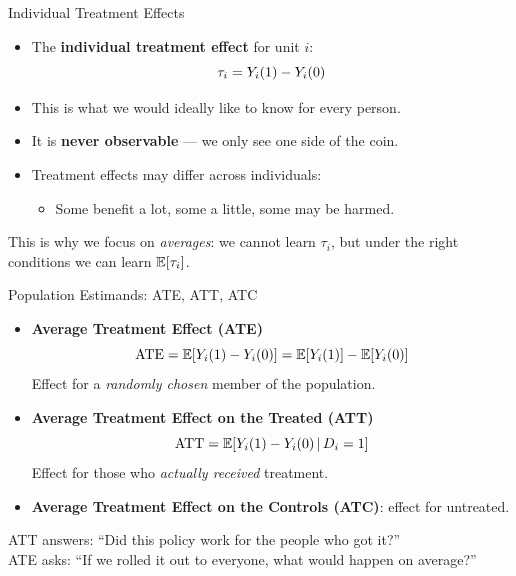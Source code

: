 \documentclass[aspectratio=169, 11pt]{beamer}
\begin{document}
\begin{frame}[t]{Individual Treatment Effects}
\begin{itemize}
  \setlength\itemsep{0.5em}
  \item The \textbf{individual treatment effect} for unit $i$:
  \[
    \tau_i = Y_{i}(1) - Y_{i}(0)
  \]
  \item This is what we would ideally like to know for every person.
  \item It is \textbf{never observable} — we only see one side of the coin.
  \item Treatment effects may differ across individuals:
    \begin{itemize}
      \item Some benefit a lot, some a little, some may be harmed.
    \end{itemize}
\end{itemize}
\vspace{0.4em}
\begin{intuitionbox}
This is why we focus on \emph{averages}: we cannot learn $\tau_i$,
but under the right conditions we can learn $\mathbb{E}\!\left[\tau_i\right]$.
\end{intuitionbox}
\end{frame}

\begin{frame}[t]{Population Estimands: ATE, ATT, ATC}
\vspace{0.3em}
\begin{itemize}
  \setlength\itemsep{0.5em}
  \item \textbf{Average Treatment Effect (ATE)}
  \[
    \mathrm{ATE} = \mathbb{E}\!\left[Y_{i}(1) - Y_{i}(0)\right] = \mathbb{E}\!\left[Y_{i}(1)\right] - \mathbb{E}\!\left[Y_{i}(0)\right]
  \]
  Effect for a \emph{randomly chosen} member of the population.
  \item \textbf{Average Treatment Effect on the Treated (ATT)}
  \[
    \mathrm{ATT} = \mathbb{E}\!\left[Y_{i}(1) - Y_{i}(0)\,\middle|\,D_i = 1\right]
  \]
  Effect for those who \emph{actually received} treatment.
  \item \textbf{Average Treatment Effect on the Controls (ATC)}: effect for untreated.
\end{itemize}
\vspace{0.3em}
\begin{intuitionbox}
ATT answers: ``Did this policy work for the people who got it?''\\
ATE asks: ``If we rolled it out to everyone, what would happen on average?''
\end{intuitionbox}
\end{frame}
\end{document}
